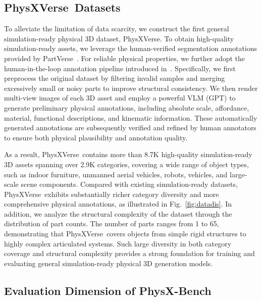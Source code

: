 \documentclass[11pt]{article}
\def\ournewdata{PhysXVerse}
\def\ourbench{PhysX-Bench}
\begin{document}
\subsection{\ournewdata\ Datasets}
To alleviate the limitation of data scarcity, we construct the first general simulation-ready physical 3D dataset, \ournewdata. To obtain high-quality simulation-ready assets, we leverage the human-verified segmentation annotations provided by PartVerse~\cite{dong2025one}. For reliable physical properties, we further adopt the human-in-the-loop annotation pipeline introduced in~\cite{cao2025physx}. Specifically, we first preprocess the original dataset by filtering invalid samples and merging excessively small or noisy parts to improve structural consistency. We then render multi-view images of each 3D asset and employ a powerful VLM (GPT) to generate preliminary physical annotations, including absolute scale, affordance, material, functional descriptions, and kinematic information. These automatically generated annotations are subsequently verified and refined by human annotators to ensure both physical plausibility and annotation quality.

As a result, \ournewdata\ contains more than 8.7K high-quality simulation-ready 3D assets spanning over 2.9K categories, covering a wide range of object types, such as indoor furniture, unmanned aerial vehicles, robots, vehicles, and large-scale scene components. Compared with existing simulation-ready datasets, \ournewdata\ exhibits substantially richer category diversity and more comprehensive physical annotations, as illustrated in Fig.~\ref{fig:datadis}. In addition, we analyze the structural complexity of the dataset through the distribution of part counts. The number of parts ranges from 1 to 65, demonstrating that \ournewdata\ covers objects from simple rigid structures to highly complex articulated systems. Such large diversity in both category coverage and structural complexity provides a strong foundation for training and evaluating general simulation-ready physical 3D generation models.




    
\subsection{Evaluation Dimension of \ourbench}

\end{document}
